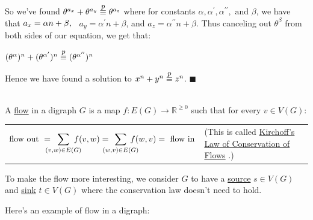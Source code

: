 \documentclass{book}
\newcommand{\hTwo}{%
   \color{MidnightBlue}%
   \fontsize{13}{15}\selectfont%
}
\newcommand{\exOne}{%
   \color{Purple}%
   \fontsize{14}{16}\selectfont%
}
\newenvironment{myIndent}{%
   \begin{adjustwidth}{2.5em}{0em}%
}{%
   \end{adjustwidth}%
}
\newcommand{\udefine}[1]{{%
   \setulcolor{Red}%
   \setul{0.14em}{0.07em}%
   \ul{#1}%
}}
\newcommand{\pprime}{\prime\prime}
\newcommand{\myHS}{ \hspace{0.5em}}
\newcommand{\myequiv}[1]{\stackrel{\mathclap{\mbox{\footnotesize{$#1$}}}}{\equiv}}
\newcommand{\mySepTwo}[1][.]{%
   {\noindent\color{#1}{\rule{6.5in}{0.5mm}}}\\%
}
\newcommand{\retTwo}{\hfill\bigbreak}
\begin{document}
{\begin{myIndent}
   So we've found $\theta^{a_x} + \theta^{a_y} \myequiv{p} \theta^{a_z}$ where for constants $\alpha, \alpha^\prime, \alpha^{\pprime}, \text{ and } \beta$, we have that $a_x = \alpha n + \beta,\myHS$ $a_y = \alpha^\prime n + \beta$, and $a_z = \alpha^{\pprime}n + \beta$. Thus canceling out $\theta^\beta$ from both sides of our equation, we get that:

   {\center $ (\theta^\alpha)^n + (\theta^{\alpha^\prime})^n \myequiv{p} (\theta^{\alpha^{\pprime}})^n $ \retTwo\par}

   Hence we have found a solution to $x^n + y^n \myequiv{p} z^n$. $\blacksquare$\retTwo
\end{myIndent}}

\mySepTwo

A \udefine{flow} in a digraph $G$ is a map $f: E(G) \rightarrow \mathbb{R}^{\geq 0}$ such that for every $v \in V(G)$:

{\begin{center}
   \begin{tabular}{ l p{2in} }
      $\text{flow out } = \hspace{-0.9em}{\displaystyle\sum\limits_{(v,w) \in E(G)}}\hspace{-0.9em}f(v, w) = \hspace{-1em}{\displaystyle\sum\limits_{(w,v) \in E(G)}}\hspace{-1em}f(w, v) = \text{ flow in}$ & \hTwo (This is called \udefine{Kirchoff's Law of Conservation of Flows}.)
   \end{tabular}\retTwo
\end{center}}

To make the flow more interesting, we consider $G$ to have a \udefine{source} $s \in V(G)$ and \udefine{sink} $t \in V(G)$ where the conservation law doesn't need to hold.

\newpage
\exOne
Here's an example of flow in a digraph:\\ [-11pt]
\end{document}
